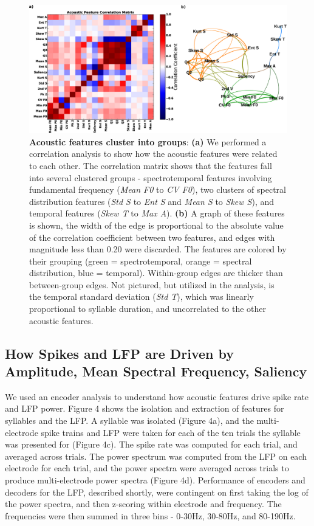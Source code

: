 \begin{figure}
    \caption{\textbf{Acoustic features cluster into groups}: \textbf{(a)} We performed a correlation analysis to show how the acoustic features were related to each other. The correlation matrix shows that the features fall into several clustered groups - spectrotemporal features involving fundamental frequency ({\em Mean F0} to {\em CV F0}), two clusters of spectral distribution features ({\em Std S} to {\em Ent S} and {\em Mean S} to {\em Skew S}), and temporal features ({\em Skew T} to {\em Max A}). \textbf{(b)} A graph of these features is shown, the width of the edge is proportional to the absolute value of the correlation coefficient between two features, and edges with magnitude less than 0.20 were discarded. The features are colored by their grouping (green = spectrotemporal, orange = spectral distribution, blue = temporal). Within-group edges are thicker than between-group edges. Not pictured, but utilized in the analysis, is the temporal standard deviation ({\em Std T}), which was linearly proportional to syllable duration, and uncorrelated to the other acoustic features.
}
    \centering
    \includegraphics[scale=0.25]{figure3.eps}
\end{figure}


\subsection{How Spikes and LFP are Driven by Amplitude, Mean Spectral Frequency, Saliency}

    We used an encoder analysis to understand how acoustic features drive spike rate and LFP power. Figure 4 shows the isolation and extraction of features for syllables and the LFP. A syllable was isolated (Figure 4a), and the multi-electrode spike trains and LFP were taken for each of the ten trials the syllable was presented for (Figure 4c). The spike rate was computed for each trial, and averaged across trials. The power spectrum was computed from the LFP on each electrode for each trial, and the power spectra were averaged across trials to produce multi-electrode power spectra (Figure 4d). Performance of encoders and decoders for the LFP, described shortly, were contingent on first taking the log of the power spectra, and then z-scoring within electrode and frequency. The frequencies were then summed in three bins - 0-30Hz, 30-80Hz, and 80-190Hz.

